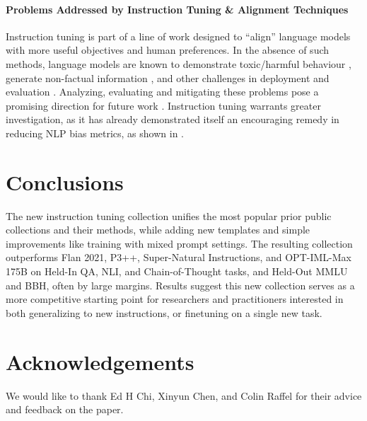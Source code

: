 \vspace{-2mm}
\paragraph{Problems Addressed by Instruction Tuning \& Alignment Techniques}
Instruction tuning is part of a line of work designed to ``align'' language models with more useful objectives and human preferences.
In the absence of such methods, language models are known to demonstrate toxic/harmful behaviour \citep{sheng-etal-2019-woman,liang2021towards,wallace-etal-2019-universal}, generate non-factual information \citep{maynez-etal-2020-faithfulness,longpre2021entity,devaraj-etal-2022-evaluating}, and other challenges in deployment and evaluation \citep{zellers2019defending,mcguffie2020radicalization,talat2022you}.
Analyzing, evaluating and mitigating these problems pose a promising direction for future work \citep{gao2022attributed,ganguli2022red}.
Instruction tuning warrants greater investigation, as it has already demonstrated itself an encouraging remedy in reducing NLP bias metrics, as shown in \citet{chung2022scaling}.

\section{Conclusions}
The new \flantwo{} instruction tuning collection unifies the most popular prior public collections and their methods, while adding new templates and simple improvements like training with mixed prompt settings.
The resulting collection outperforms Flan 2021, P3++, Super-Natural Instructions, and OPT-IML-Max 175B on Held-In QA, NLI, and Chain-of-Thought tasks, and Held-Out MMLU and BBH, often by large margins.
Results suggest this new collection serves as a more competitive starting point for researchers and practitioners interested in both generalizing to new instructions, or finetuning on a single new task.

\section*{Acknowledgements}

We would like to thank Ed H Chi, Xinyun Chen, and Colin Raffel for their advice and feedback on the paper.

\clearpage

\clearpage

